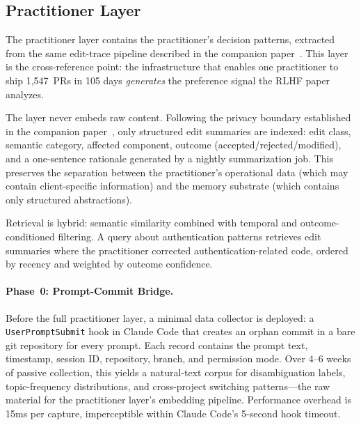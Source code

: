 \documentclass[11pt]{article}
\begin{document}
\subsection{Practitioner Layer}
\label{sec:practitioner-layer}

The practitioner layer contains the practitioner's decision patterns, extracted from the same edit-trace pipeline described in the companion paper~\citep[\S3]{ovcharov2026recursive}.
This layer is the cross-reference point: the infrastructure that enables one practitioner to ship 1{,}547~PRs in 105 days \emph{generates} the preference signal the RLHF paper analyzes.

The layer never embeds raw content.
Following the privacy boundary established in the companion paper~\citep[\S6]{ovcharov2026recursive}, only structured edit summaries are indexed: edit class, semantic category, affected component, outcome (accepted/rejected/modified), and a one-sentence rationale generated by a nightly summarization job.
This preserves the separation between the practitioner's operational data (which may contain client-specific information) and the memory substrate (which contains only structured abstractions).

Retrieval is hybrid: semantic similarity combined with temporal and outcome-conditioned filtering.
A query about authentication patterns retrieves edit summaries where the practitioner corrected authentication-related code, ordered by recency and weighted by outcome confidence.

\paragraph{Phase~0: Prompt-Commit Bridge.}
Before the full practitioner layer, a minimal data collector is deployed: a \texttt{UserPromptSubmit} hook in Claude Code that creates an orphan commit in a bare git repository for every prompt.
Each record contains the prompt text, timestamp, session ID, repository, branch, and permission mode.
Over 4--6 weeks of passive collection, this yields a natural-text corpus for disambiguation labels, topic-frequency distributions, and cross-project switching patterns---the raw material for the practitioner layer's embedding pipeline.
Performance overhead is 15ms per capture, imperceptible within Claude Code's 5-second hook timeout.


\end{document}
